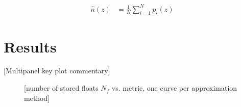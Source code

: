 \documentclass[\docopts]{\docclass}
\begin{document}
\begin{align}
\hat{n}(z) &= \frac{1}{N}\sum_{i=1}^{N}p_{i}(z)
\label{eq:nz}
\end{align}






\section{Results}
\label{sec:results}

%

[Multipanel key plot commentary]

\begin{figure}
\caption{[number of stored floats $N_{f}$ vs. metric, one curve per approximation method]\label{fig:results}}
\end{figure}


%
\end{document}
